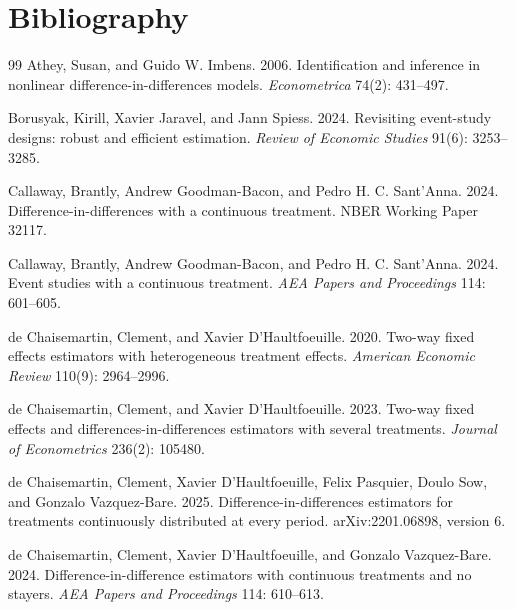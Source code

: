 \documentclass[11pt]{article}
\theoremstyle{definition}
\theoremstyle{plain}
\theoremstyle{remark}
\begin{document}
\section*{Bibliography}
\begin{thebibliography}{99}
Athey, Susan, and Guido W. Imbens. 2006.
Identification and inference in nonlinear difference-in-differences models.
\emph{Econometrica} 74(2): 431--497.

Borusyak, Kirill, Xavier Jaravel, and Jann Spiess. 2024.
Revisiting event-study designs: robust and efficient estimation.
\emph{Review of Economic Studies} 91(6): 3253--3285.

Callaway, Brantly, Andrew Goodman-Bacon, and Pedro H. C. Sant'Anna. 2024.
Difference-in-differences with a continuous treatment.
NBER Working Paper 32117.

Callaway, Brantly, Andrew Goodman-Bacon, and Pedro H. C. Sant'Anna. 2024.
Event studies with a continuous treatment.
\emph{AEA Papers and Proceedings} 114: 601--605.

de Chaisemartin, Clement, and Xavier D'Haultfoeuille. 2020.
Two-way fixed effects estimators with heterogeneous treatment effects.
\emph{American Economic Review} 110(9): 2964--2996.

de Chaisemartin, Clement, and Xavier D'Haultfoeuille. 2023.
Two-way fixed effects and differences-in-differences estimators with several treatments.
\emph{Journal of Econometrics} 236(2): 105480.

de Chaisemartin, Clement, Xavier D'Haultfoeuille, Felix Pasquier, Doulo Sow, and Gonzalo Vazquez-Bare. 2025.
Difference-in-differences estimators for treatments continuously distributed at every period.
arXiv:2201.06898, version 6.

de Chaisemartin, Clement, Xavier D'Haultfoeuille, and Gonzalo Vazquez-Bare. 2024.
Difference-in-difference estimators with continuous treatments and no stayers.
\emph{AEA Papers and Proceedings} 114: 610--613.


\end{thebibliography}
\end{document}
